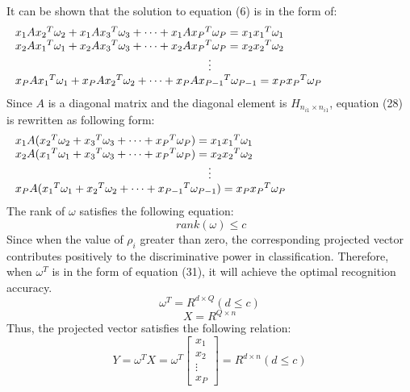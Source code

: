 \documentclass[10pt,journal,compsoc]{IEEEtran}
\begin{document}
It can be shown that the solution to equation (6) is in the form of:
{\small
\begin{equation}
\begin{array}{l}
{x_1}A{x_2}^T{\omega _2} + {x_1}A{x_3}^T{\omega _3} +  \cdots + {x_1}A{x_P}^T{\omega _P} = {x_1}{x_1}^T{\omega _1}\\
{x_2}A{x_1}^T{\omega _1} + {x_2}A{x_3}^T{\omega _3} +  \cdots + {x_2}A{x_P}^T{\omega _P} = {x_2}{x_2}^T{\omega _2}\\
                \centerline \vdots \\
{x_P}A{x_1}^T{\omega _1} + {x_P}A{x_2}^T{\omega _2} +  \cdots + {x_P}A{x_{P - 1}}^T{\omega _{P - 1}} = {x_P}{x_P}^T{\omega _P}
\end{array}
\end{equation}}
Since $A$ is a diagonal matrix and the diagonal element is ${H_{{n_{i{1}}} \times {n_{i1}}}}$, equation (28) is rewritten as following form:
\begin{equation}
\begin{array}{l}
{x_1}A({x_2}^T{\omega _2} + {x_3}^T{\omega _3} +  \cdots  + {x_P}^T{\omega _P}) = {x_1}{x_1}^T{\omega _1}\\
{x_2}A({x_1}^T{\omega _1} + {x_3}^T{\omega _3} +  \cdots  + {x_P}^T{\omega _P}) = {x_2}{x_2}^T{\omega _2}\\
                \centerline \vdots \\
{x_P}A({x_1}^T{\omega _1} + {x_2}^T{\omega _2} +  \cdots  + {x_{P - 1}}^T{\omega _{P - 1}}) = {x_P}{x_P}^T{\omega _P}
\end{array}
\end{equation}
The rank of $\omega$ satisfies the following equation:
\begin{equation} \ rank(\omega) \le c \end{equation}
Since when the value of ${\rho _i}$ greater than zero, the corresponding projected vector contributes positively to the discriminative power in classification. Therefore, when $\omega ^T$ is in the form of equation (31), it will achieve the optimal recognition accuracy.
\begin{equation}
{\omega ^T} = {R^{d \times Q}}(d \le c)
\end{equation}
\begin{equation}
{X} = {R^{Q \times n}}
\end{equation}
Thus, the projected vector satisfies the following relation:
\begin{equation}
Y = {\omega ^T}X = {\omega ^T}\left[ \begin{array}{l}
{x_1}\\
{x_2}\\
 \vdots \\
{x_P}
\end{array} \right] = {R^{d \times n}}  (d \le c)
\end{equation}
\end{document}
